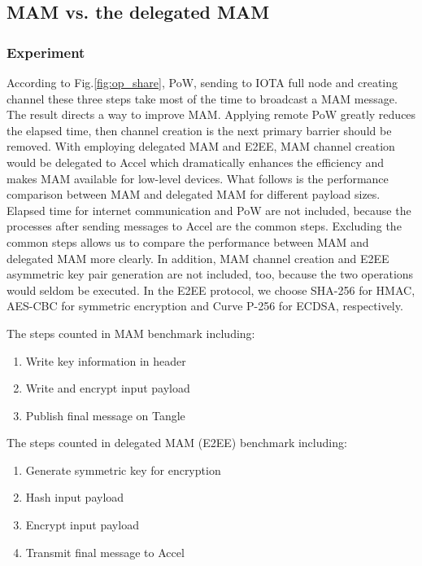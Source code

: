 \documentclass[conference]{IEEEtran}
\begin{document}
\subsection{MAM vs. the delegated MAM}
\label{section:smart_contract_evaluation}
\subsubsection{Experiment}
According to Fig.\ref{fig:op_share}, PoW, sending to IOTA full node and creating channel these three steps take most of the time to broadcast a MAM message. The result directs a way to improve MAM. Applying remote PoW greatly reduces the elapsed time, then channel creation is the next primary barrier should be removed. With employing delegated MAM and E2EE, MAM channel creation would be delegated to Accel which dramatically enhances the efficiency and makes MAM available for low-level devices. What follows is the performance comparison between MAM and delegated MAM for different payload sizes. Elapsed time for internet communication and PoW are not included, because the processes after sending messages to Accel are the common steps. Excluding the common steps allows us to compare the performance between MAM and delegated MAM more clearly. In addition, MAM channel creation and E2EE asymmetric key pair generation are not included, too, because the two operations would seldom be executed. In the E2EE protocol, we choose SHA-256 for HMAC, AES-CBC for symmetric encryption and Curve P-256 for ECDSA, respectively.

The steps counted in MAM benchmark including:
\begin{enumerate}
    \item Write key information in header
	\item Write and encrypt input payload
	\item Publish final message on Tangle
\end{enumerate}

The steps counted in delegated MAM (E2EE) benchmark including:
\begin{enumerate}
	\item Generate symmetric key for encryption
	\item Hash input payload
	\item Encrypt input payload
	\item Transmit final message to Accel
\end{enumerate}
\end{document}
